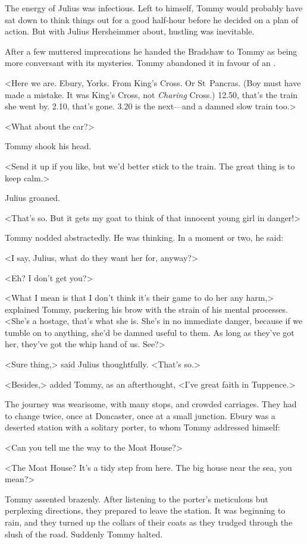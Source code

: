 The energy of Julius was infectious. Left to himself, Tommy would probably have sat down to think things out for a good half-hour before he decided on a plan of action. But with Julius Hersheimmer about, hustling was inevitable.

After a few muttered imprecations he handed the Bradshaw to Tommy as being more conversant with its mysteries. Tommy abandoned it in favour of an .

<Here we are. Ebury, Yorks. From King's Cross. Or St~Pancras. (Boy must have made a mistake. It was King's Cross, not \emph{Charing} Cross.) 12.50, that's the train she went by. 2.10, that's gone. 3.20 is the next—and a damned slow train too.>

<What about the car?>

Tommy shook his head.

<Send it up if you like, but we'd better stick to the train. The great thing is to keep calm.>

Julius groaned.

<That's so. But it gets my goat to think of that innocent young girl in danger!>

Tommy nodded abstractedly. He was thinking. In a moment or two, he said:

<I say, Julius, what do they want her for, anyway?>

<Eh? I don't get you?>

<What I mean is that I don't think it's their game to do her any harm,> explained Tommy, puckering his brow with the strain of his mental processes. <She's a hostage, that's what she is. She's in no immediate danger, because if we tumble on to anything, she'd be damned useful to them. As long as they've got her, they've got the whip hand of us. See?>

<Sure thing,> said Julius thoughtfully. <That's so.>

<Besides,> added Tommy, as an afterthought, <I've great faith in Tuppence.>

The journey was wearisome, with many stops, and crowded carriages. They had to change twice, once at Doncaster, once at a small junction. Ebury was a deserted station with a solitary porter, to whom Tommy addressed himself:

<Can you tell me the way to the Moat House?>

<The Moat House? It's a tidy step from here. The big house near the sea, you mean?>

Tommy assented brazenly. After listening to the porter's meticulous but perplexing directions, they prepared to leave the station. It was beginning to rain, and they turned up the collars of their coats as they trudged through the slush of the road. Suddenly Tommy halted.

